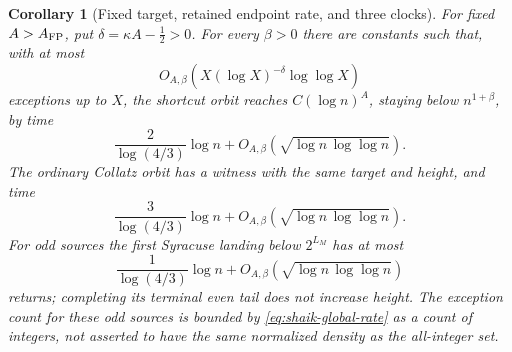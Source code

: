 \documentclass[11pt]{article}
\newtheorem{corollary}[proposition]{Corollary}
\theoremstyle{remark}\newtheorem{remark}[proposition]{Remark}
\begin{document}
\begin{corollary}[Fixed target, retained endpoint rate, and three clocks]
\label{cor:shaik-fixed-rate-clocks}
For fixed \(A>A_{\rm FP}\), put \(\delta=\kappa A-\tfrac12>0\).
For every \(\beta>0\) there are constants such that, with at most
\begin{equation}\label{eq:shaik-global-rate}
 O_{A,\beta}\left(
 X(\log X)^{-\delta}\log\log X\right)
\end{equation}
exceptions up to \(X\), the shortcut orbit reaches
\(C(\log n)^A\), staying below \(n^{1+\beta}\), by time
\[
 \frac{2}{\log(4/3)}\log n+
 O_{A,\beta}(\sqrt{\log n\,\log\log n}).
\]
The ordinary Collatz orbit has a witness with the same target and
height, and time
\[
 \frac{3}{\log(4/3)}\log n+
 O_{A,\beta}(\sqrt{\log n\,\log\log n}).
\]
For odd sources the first Syracuse landing below \(2^{L_M}\) has
at most
\[
 \frac1{\log(4/3)}\log n+
 O_{A,\beta}(\sqrt{\log n\,\log\log n})
\]
returns; completing its terminal even tail does not increase height.
The exception count for these odd sources is bounded by
\eqref{eq:shaik-global-rate} as a count of integers, not asserted to
have the same normalized density as the all-integer set.
\end{corollary}
\end{document}
